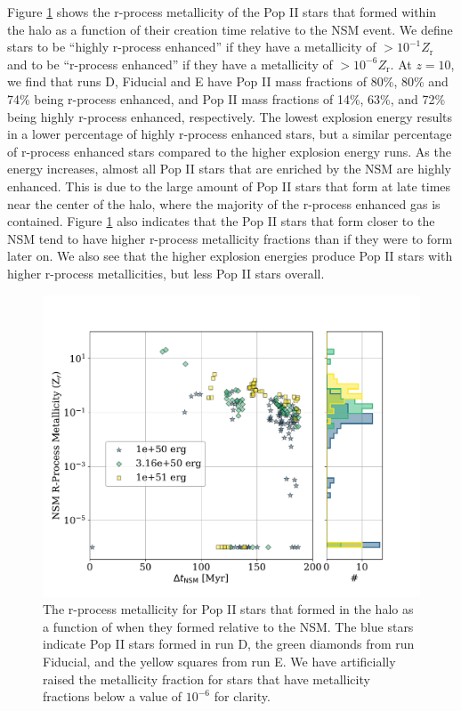 \documentclass[fleqn,usenatbib]{mnras}
\begin{document}
Figure \ref{fig:eng_NSM_deltat} shows the r-process metallicity of the Pop II stars that formed within the halo as a function of their creation time relative to the NSM event. We define stars to be ``highly r-process enhanced'' if they have a metallicity of $> 10^{-1} Z_{\mathrm{r}}$ and to be ``r-process enhanced'' if they have a metallicity of $> 10^{-6} Z_{\mathrm{r}}$. At $z = 10$, we find that runs D, Fiducial and E have Pop II mass fractions of 80\%, 80\% and 74\% being r-process enhanced, and Pop II mass fractions of 14\%, 63\%, and 72\% being highly r-process enhanced, respectively. The lowest explosion energy results in a lower percentage of highly r-process enhanced stars, but a similar percentage of r-process enhanced stars compared to the higher explosion energy runs. As the energy increases, almost all Pop II stars that are enriched by the NSM are highly enhanced. This is due to the large amount of Pop II stars that form at late times near the center of the halo, where the majority of the r-process enhanced gas is contained. Figure \ref{fig:eng_NSM_deltat} also indicates that the Pop II stars that form closer to the NSM tend to have higher r-process metallicity fractions than if they were to form later on. We also see that the higher explosion energies produce Pop II stars with higher r-process metallicities, but less Pop II stars overall. 


\begin{figure} 
	\includegraphics[width=\columnwidth]{plots/eng_NSM_deltat.pdf}
	\caption[R-process metallicity as a function of $\Delta t_{\mathrm{NSM}}$ for the energy variation runs.]{The r-process metallicity for Pop II stars that formed in the halo as a function of when they formed relative to the NSM. The blue stars indicate Pop II stars formed in run D, the green diamonds from run Fiducial, and the yellow squares from run E. We have artificially raised the metallicity fraction for stars that have metallicity fractions below a value of $10^{-6}$ for clarity.}
	\label{fig:eng_NSM_deltat}
\end{figure}
\end{document}
